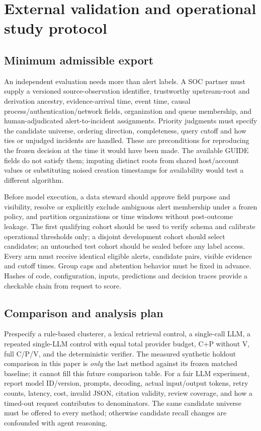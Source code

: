 \section{External validation and operational study protocol}\label{sec:validation}
\subsection{Minimum admissible export}
An independent evaluation needs more than alert labels. A SOC partner must supply a versioned source-observation identifier, trustworthy upstream-root and derivation ancestry, evidence-arrival time, event time, causal process/authentication/network fields, organization and queue membership, and human-adjudicated alert-to-incident assignments. Priority judgments must specify the candidate universe, ordering direction, completeness, query cutoff and how ties or unjudged incidents are handled. These are preconditions for reproducing the frozen decision at the time it would have been made. The available GUIDE fields do not satisfy them; imputing distinct roots from shared host/account values or substituting noised creation timestamps for availability would test a different algorithm.

Before model execution, a data steward should approve field purpose and visibility, resolve or explicitly exclude ambiguous alert membership under a frozen policy, and partition organizations or time windows without post-outcome leakage. The first qualifying cohort should be used to verify schema and calibrate operational thresholds only; a disjoint development cohort should select candidates; an untouched test cohort should be sealed before any label access. Every arm must receive identical eligible alerts, candidate pairs, visible evidence and cutoff times. Group caps and abstention behavior must be fixed in advance. Hashes of code, configuration, inputs, predictions and decision traces provide a checkable chain from request to score.

\subsection{Comparison and analysis plan}
Prespecify a rule-based clusterer, a lexical retrieval control, a single-call LLM, a repeated single-LLM control with equal total provider budget, C+P without V, full C/P/V, and the deterministic verifier. The measured synthetic holdout comparison in this paper is \emph{only} the last method against its frozen matched baseline; it cannot fill this future comparison table. For a fair LLM experiment, report model ID/version, prompts, decoding, actual input/output tokens, retry counts, latency, cost, invalid JSON, citation validity, review coverage, and how a timed-out request contributes to denominators. The same candidate universe must be offered to every method; otherwise candidate recall changes are confounded with agent reasoning.


